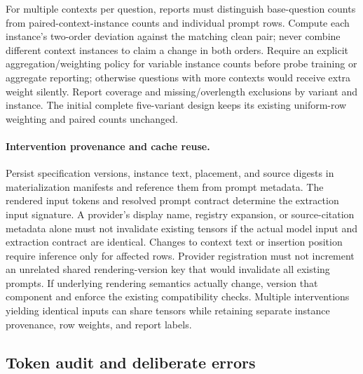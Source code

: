 \documentclass[11pt]{article}
\begin{document}
For multiple contexts per question, reports must distinguish base-question counts from paired-context-instance counts and individual prompt rows.
Compute each instance's two-order deviation against the matching clean pair; never combine different context instances to claim a change in both orders.
Require an explicit aggregation/weighting policy for variable instance counts before probe training or aggregate reporting; otherwise questions with more contexts would receive extra weight silently.
Report coverage and missing/overlength exclusions by variant and instance.
The initial complete five-variant design keeps its existing uniform-row weighting and paired counts unchanged.

\paragraph{Intervention provenance and cache reuse.}
Persist specification versions, instance text, placement, and source digests in materialization manifests and reference them from prompt metadata.
The rendered input tokens and resolved prompt contract determine the extraction input signature.
A provider's display name, registry expansion, or source-citation metadata alone must not invalidate existing tensors if the actual model input and extraction contract are identical.
Changes to context text or insertion position require inference only for affected rows.
Provider registration must not increment an unrelated shared rendering-version key that would invalidate all existing prompts.
If underlying rendering semantics actually change, version that component and enforce the existing compatibility checks.
Multiple interventions yielding identical inputs can share tensors while retaining separate instance provenance, row weights, and report labels.

\subsection{Token audit and deliberate errors}
\end{document}
